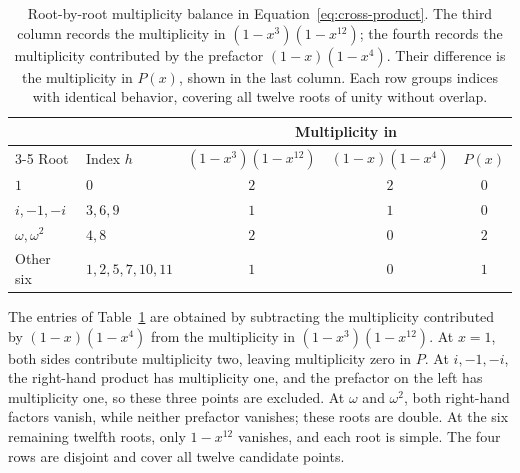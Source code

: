 \documentclass[11pt,a4paper]{article}
\numberwithin{equation}{section}
\theoremstyle{uprightpaper}
\begin{document}
\begin{table}[H]
\centering
\caption{Root-by-root multiplicity balance in Equation~\eqref{eq:cross-product}.
The third column records the multiplicity in $(1-x^3)(1-x^{12})$;
the fourth records the multiplicity contributed by the prefactor
$(1-x)(1-x^4)$. Their difference is the multiplicity in $P(x)$,
shown in the last column. Each row groups indices with identical
behavior, covering all twelve roots of unity without overlap.}
\label{tab:multiplicities}
\begingroup
\renewcommand{\arraystretch}{1.48}
\setlength{\tabcolsep}{5pt}
\begin{tabular*}{\linewidth}{@{\extracolsep{\fill}}llccc@{}}
\toprule
 & & \multicolumn{3}{c}{Multiplicity in} \\
\cmidrule(lr){3-5}
Root & Index $h$ & $(1-x^3)(1-x^{12})$ & $(1-x)(1-x^4)$ & $P(x)$ \\
\midrule
$1$ & $0$ & $2$ & $2$ & $0$ \\
\addlinespace[2pt]
$i,-1,-i$ & $3,6,9$ & $1$ & $1$ & $0$ \\
\addlinespace[2pt]
$\omega,\omega^2$ & $4,8$ & $2$ & $0$ & $2$ \\
\addlinespace[2pt]
Other six & $1,2,5,7,10,11$ & $1$ & $0$ & $1$ \\
\bottomrule
\end{tabular*}
\endgroup
\end{table}

The entries of Table~\ref{tab:multiplicities} are obtained by subtracting the
multiplicity contributed by $(1-x)(1-x^4)$ from the multiplicity in
$(1-x^3)(1-x^{12})$. At $x=1$, both sides contribute multiplicity two,
leaving multiplicity zero in $P$. At $i,-1,-i$, the right-hand product
has multiplicity one, and the prefactor on the left has multiplicity one,
so these three points are excluded. At $\omega$ and $\omega^2$, both
right-hand factors vanish, while neither prefactor vanishes;
these roots are double. At the six remaining twelfth roots, only
$1-x^{12}$ vanishes, and each root is simple. The four rows are disjoint
and cover all twelve candidate points.
\end{document}
